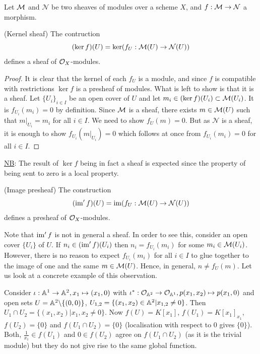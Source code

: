 \documentclass[a4paper,11pt]{article}
\begin{document}
			Let $\M$ and $\mathcal{N}$ be two sheaves of modules over a scheme $X$, and $f:\M\rightarrow\mathcal{N}$ a morphism.

			\begin{prop}
				(Kernel sheaf) The contruction
				\begin{equation*}
					(\ker f)(U)=\ker(f_U:\M(U)\rightarrow\mathcal{N}(U))
				\end{equation*}
				defines a sheaf of $\O_X$-modules.
			\end{prop}
			\begin{proof}
				It is clear that the kernel of each $f_U$ is a module, and since $f$ is compatible with restrictions $\ker f$ is a presheaf of modules. What is left to show is that it is a sheaf. Let $\{U_i\}_{i\in I}$ be an open cover of $U$ and let $m_i\in(\ker f)(U_i)\subset\M(U_i)$. It is $f_{U_i}(m_i)=0$ by definition. Since $\M$ is a sheaf, there exists $m\in\M(U)$ such that $m|_{U_i}=m_i$ for all $i\in I$. We need to show $f_U(m)=0$. But as $\mathcal{N}$ is a sheaf, it is enough to show $f_{U_i}(m|_{U_i})=0$ which follows at once from $f_{U_i}(m_i)=0$ for all $i\in I$.
			\end{proof}

			\noindent\underline{NB}: The result of $\ker f$ being in fact a sheaf is expected since the property of being sent to zero is a local property.

			\begin{prop}
				(Image presheaf) The construction 
				\begin{equation*}
					(\im^\prime f)(U)=\im(f_U:\M(U)\rightarrow\mathcal{N}(U))
				\end{equation*}
				defines a presheaf of $\O_X$-modules.
			\end{prop}

			\noindent Note that $\im^\prime f$ is not in general a sheaf. In order to see this, consider an open cover $\{U_i\}$ of $U$. If $n_i\in(\im^\prime f)(U_i)$ then $n_i=f_{U_i}(m_i)$ for some $m_i\in\M(U_i)$. However, there is no reason to expect $f_{U_i}(m_i)$ for all $i\in I$ to glue together to the image of one and the same $m\in\M(U)$. Hence, in general, $n\neq f_U(m)$.
			Let us look at a concrete example of this observation.

			\begin{eg}
				Consider $\iota:\AA^1\rightarrow\AA^2,x_1\mapsto(x_1,0)$ with $\iota^\ast:\O_{\AA^2}\rightarrow\O_{\AA^1}, p(x_1,x_2)\mapsto p(x_1,0)$ and open sets $U=\AA^2\backslash\{(0,0)\}$, $U_{1,2}=\{(x_1,x_2)\in\AA^2|x_{1,2}\neq0\}$. Then $U_1\cap U_2=\{(x_1,x_2)|x_1,x_2\neq0\}$. Now $f(U)=K[x_1]$, $f(U_1)=K[x_1]_{x_1}$, $f(U_2)=\{0\}$ and $f(U_1\cap U_2)=\{0\}$ (localisation with respect to $0$ gives $\{0\}$). Both, $\frac{1}{x_1}\in f(U_1)$ and $0\in f(U_2)$ agree on $f(U_1\cap U_2)$ (as it is the trivial module) but they do not give rise to the same global function.   
			\end{eg}
\end{document}
